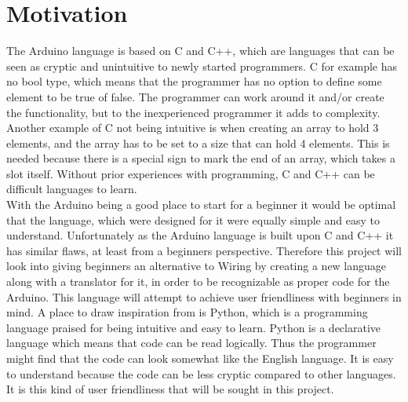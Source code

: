 \section{Motivation}\label{introduction:motivation}
The Arduino language is based on C and C++, which are languages that can be seen as cryptic and unintuitive to newly started programmers. C for example has no bool type, which means that the programmer has no option to define some element to be true of false. The programmer can work around it and/or create the functionality, but to the inexperienced programmer it adds to complexity. Another example of C not being intuitive is when creating an array to hold 3 elements, and the array has to be set to a size that can hold 4 elements. This is needed because there is a special sign to mark the end of an array, which takes a slot itself.  Without prior experiences with programming, C and C++ can be difficult languages to learn. \\

With the Arduino being a good place to start for a beginner it would be optimal that the language, which were designed for it were equally simple and easy to understand. Unfortunately as the Arduino language is built upon C and C++ it has similar flaws, at least from a beginners perspective. Therefore this project will look into giving beginners an alternative to Wiring by creating a new language along with a translator for it, in order to be recognizable as proper code for the Arduino. This language will attempt to achieve user friendliness with beginners in mind. A place to draw inspiration from is Python, which is a programming language praised for being intuitive and easy to learn.  Python is a declarative language which means that code can be read logically.  Thus the programmer might find that the code can look somewhat like the English language. It is easy to understand because the code can be less cryptic compared to other languages. It is this kind of user friendliness that will be sought in this project.